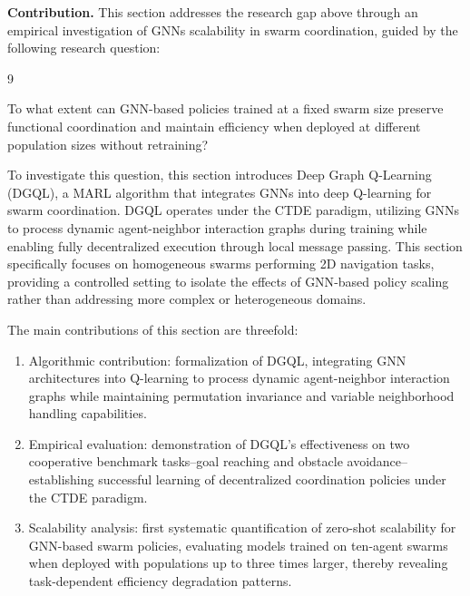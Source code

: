 \textbf{Contribution.}
This section addresses the research gap above through an empirical investigation 
 of \glspl{GNN} scalability in swarm coordination, 
 guided by the following research question:

\begin{chapRQ}{9}
  \item
  To what extent can \gls{GNN}-based policies trained at a fixed swarm size
  preserve functional coordination and maintain efficiency when deployed
  at different population sizes without retraining?
  \label{rq:dgql}
\end{chapRQ}

%
To investigate this question, 
 this section introduces Deep Graph Q-Learning (DGQL), 
 a \gls{MARL} algorithm that integrates \glspl{GNN} into deep Q-learning for swarm coordination. 
%
DGQL operates under the CTDE paradigm, 
 utilizing \glspl{GNN} to process dynamic agent-neighbor interaction graphs during training 
 while enabling fully decentralized execution through local message passing.
%
This section specifically focuses on homogeneous swarms performing 2D navigation tasks,
 providing a controlled setting to isolate the effects of \gls{GNN}-based policy scaling 
 rather than addressing more complex or heterogeneous domains.

The main contributions of this section are threefold:

\begin{enumerate}
    \item Algorithmic contribution: 
    formalization of DGQL, integrating \gls{GNN} architectures into Q-learning 
    to process dynamic agent-neighbor interaction graphs 
    while maintaining permutation invariance and variable neighborhood handling capabilities.
    
    \item Empirical evaluation: 
    demonstration of DGQL's effectiveness on two cooperative benchmark tasks--goal 
    reaching and obstacle avoidance--establishing successful learning 
    of decentralized coordination policies under the CTDE paradigm.
    
    \item Scalability analysis: 
    first systematic quantification of zero-shot scalability for GNN-based swarm policies, 
    evaluating models trained on ten-agent swarms when deployed with populations 
    up to three times larger, thereby revealing task-dependent efficiency degradation patterns.
\end{enumerate}

